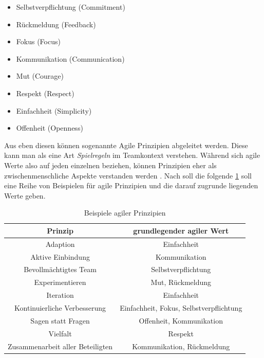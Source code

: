 \begin{itemize}[noitemsep, topsep=0pt]
	\item Selbstverpflichtung (Commitment)
	\item Rückmeldung (Feedback)
	\item Fokus (Focus)
	\item Kommunikation (Communication) 
	\item Mut (Courage)
	\item Respekt (Respect)
	\item Einfachheit (Simplicity)
	\item Offenheit (Openness)
\end{itemize}

Aus eben diesen können sogenannte Agile Prinzipien abgeleitet werden. Diese kann man als eine Art \textit{Spielregeln} im Teamkontext verstehen. Während sich agile Werte also auf jeden einzelnen beziehen, können Prinzipien eher als zwischenmenschliche Aspekte verstanden werden \cite[S. 12]{hofert_agiler_2016}. Nach  soll die folgende \ref{tab:agileprinzipien} soll eine Reihe von Beispielen für agile Prinzipien und die darauf zugrunde liegenden Werte geben.

\begin{table}[htbp]
	\caption{Beispiele agiler Prinzipien}
	\begin{center}
			\begin{tabular}{c c }
				\hline
				\textbf{Prinzip} & \textbf{grundlegender agiler Wert}\\
				\hline
				Adaption & Einfachheit \\
				Aktive Einbindung & Kommunikation\\
				Bevollmächtigtes Team & Selbstverpflichtung \\
				Experimentieren & Mut, Rückmeldung \\
				Iteration &  Einfachheit \\
				Kontinuierliche Verbesserung & Einfachheit, Fokus, Selbstverpflichtung \\
				Sagen statt Fragen & Offenheit, Kommunikation \\
				Vielfalt & Respekt \\
				Zusammenarbeit aller Beteiligten & Kommunikation, Rückmeldung \\
				\hline
			\end{tabular}
		\label{tab:agileprinzipien}
	\end{center}
\end{table}

